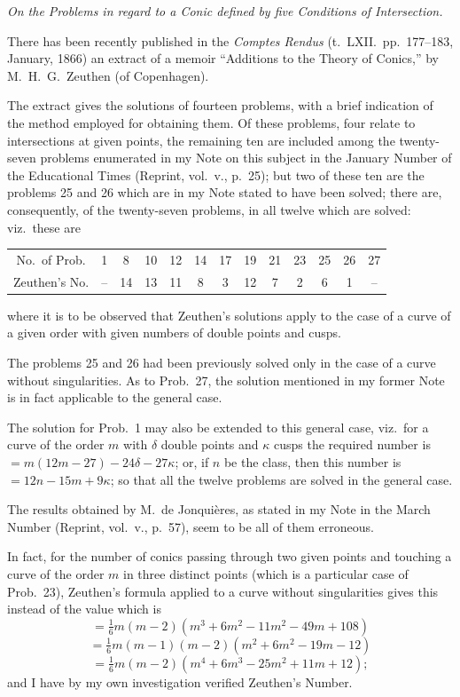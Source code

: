 \documentclass[11pt,a4paper]{article}
\theoremstyle{plain}
\theoremstyle{definition}
\theoremstyle{remark}
\begin{document}
\textit{On the Problems in regard to a Conic defined by five Conditions of Intersection.}

There has been recently published in the \textit{Comptes Rendus} (t.\ LXII.\ pp.\ 177--183, January, 1866) an extract of a memoir ``Additions to the Theory of Conics,'' by M.\ H.\ G.\ Zeuthen (of Copenhagen).

The extract gives the solutions of fourteen problems, with a brief indication of the method employed for obtaining them. Of these problems, four relate to intersections at given points, the remaining ten are included among the twenty-seven problems enumerated in my Note on this subject in the January Number of the Educational Times (Reprint, vol.\ v., p.\ 25); but two of these ten are the problems 25 and 26 which are in my Note stated to have been solved; there are, consequently, of the twenty-seven problems, in all twelve which are solved: viz.\ these are

\begin{center}
\begin{tabular}{c|cccccccccccc}
No.\ of Prob. & 1 & 8 & 10 & 12 & 14 & 17 & 19 & 21 & 23 & 25 & 26 & 27 \\
Zeuthen's No. & -- & 14 & 13 & 11 & 8 & 3 & 12 & 7 & 2 & 6 & 1 & -- \\
\end{tabular}
\end{center}

where it is to be observed that Zeuthen's solutions apply to the case of a curve of a given order with given numbers of double points and cusps.

The problems 25 and 26 had been previously solved only in the case of a curve without singularities. As to Prob.\ 27, the solution mentioned in my former Note is in fact applicable to the general case.

The solution for Prob.\ 1 may also be extended to this general case, viz.\ for a curve of the order $m$ with $\delta$ double points and $\kappa$ cusps the required number is $=m(12m-27)-24\delta-27\kappa$; or, if $n$ be the class, then this number is $=12n-15m+9\kappa$; so that all the twelve problems are solved in the general case.

The results obtained by M.\ de Jonqui\`eres, as stated in my Note in the March Number (Reprint, vol.\ v., p.\ 57), seem to be all of them erroneous.

In fact, for the number of conics passing through two given points and touching a curve of the order $m$ in three distinct points (which is a particular case of Prob.\ 23), Zeuthen's formula applied to a curve without singularities gives this instead of the value which is
\[
=\tfrac16 m(m-2)(m^{3}+6m^{2}-11m^{2}-49m+108)
\]
\[
=\tfrac16 m(m-1)(m-2)(m^{2}+6m^{2}-19m-12)
\]
\[
=\tfrac16 m(m-2)(m^{4}+6m^{3}-25m^{2}+11m+12);
\]
and I have by my own investigation verified Zeuthen's Number.
\end{document}
